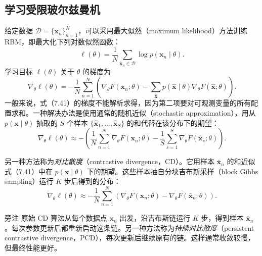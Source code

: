 \subsection{学习受限玻尔兹曼机}
给定数据 $\mathcal{D}=\{\mathbf{x}_n\}_{n=1}^{N}$，可以采用最大似然（maximum likelihood）方法训练 RBM，即最大化下列对数似然函数：
\begin{equation}
\ell(\theta)=\frac1N\sum_{\mathbf{x}_n\in\mathcal{D}}\log p(\mathbf{x}_n\mid\theta).
\tag{7.40}\label{eq:07-40}
\end{equation}
学习目标 $\ell(\theta)$ 关于 $\theta$ 的梯度为
\begin{equation}
\nabla_\theta\ell(\theta)=-\frac1N\sum_{n=1}^{N}
  \left(\nabla_\theta F(\mathbf{x}_n;\theta)-
    \sum_{\hat{\mathbf{x}}}p(\hat{\mathbf{x}}\mid\theta)
           \nabla_\theta F(\hat{\mathbf{x}};\theta)\right).
\tag{7.41}\label{eq:07-41}
\end{equation}
一般来说，式（7.41）的梯度不能解析求得，因为第二项要对可观测变量的所有配置求和。一种解决办法是使用通常的随机近似（stochastic approximation），用从 $p(\mathbf{x}\mid\theta)$ 抽取的 $S$ 个样本 $\{\hat{\mathbf{x}}_1,\ldots,\hat{\mathbf{x}}_S\}$ 的和代替在该分布下的期望：
\begin{equation}
\nabla_\theta\ell(\theta)\approx-
 \left(\frac1N\sum_{n=1}^{N}\nabla_\theta F(\mathbf{x}_n;\theta)-
       \frac1S\sum_{s=1}^{S}\nabla_\theta F(\hat{\mathbf{x}}_s;\theta)\right).
\tag{7.42}\label{eq:07-42}
\end{equation}

另一种方法称为\emph{对比散度}（contrastive divergence，CD）。它用样本 $\bar{\mathbf{x}}_n$ 的和近似式（7.41）中在 $p(\mathbf{x}\mid\theta)$ 下的期望。这些样本抽自分块吉布斯采样（block Gibbs sampling）运行 $K$ 步后得到的分布：
\begin{equation}
\nabla_\theta\ell(\theta)\approx-\frac1N\sum_{n=1}^{N}
   \left(\nabla_\theta F(\mathbf{x}_n;\theta)-\nabla_\theta F(\bar{\mathbf{x}}_n;\theta)\right).
\tag{7.43}\label{eq:07-43}
\end{equation}

\begin{booknote}{旁注}
原始 CD 算法从每个数据点 $\mathbf{x}_n$ 出发，沿吉布斯链运行 $K$ 步，得到样本 $\bar{\mathbf{x}}_n$。每次参数更新后都重新启动这条链。另一种方法称为\emph{持续对比散度}（persistent contrastive divergence，PCD），每次更新后继续原有的链。这样通常收敛较慢，但最终性能更好。
\end{booknote}

